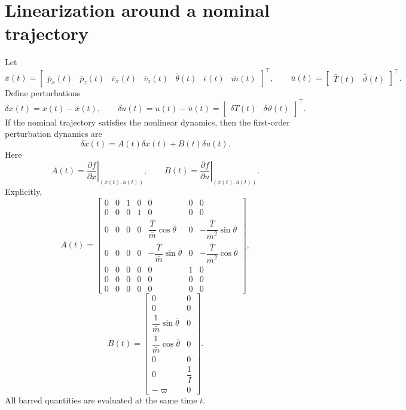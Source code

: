 \documentclass[10pt]{article}
\newcommand{\dd}{\delta}
\newcommand{\thb}{\bar\theta}
\newcommand{\mb}{\bar m}
\newcommand{\Tb}{\bar T}
\newcommand{\ub}{\bar u}
\newcommand{\xb}{\bar x}
\newcommand{\eps}{\epsilon}
\newcommand{\vphi}{\varpi}
\begin{document}
\section{Linearization around a nominal trajectory}
Let
\[
    \xb(t)=
    \begin{bmatrix}
    \bar p_x(t) & \bar p_z(t) & \bar v_x(t) & \bar v_z(t) & \thb(t) & \bar\eps(t) & \mb(t)
    \end{bmatrix}^{\top},
    \qquad
    \ub(t)=
    \begin{bmatrix}\Tb(t) & \bar\vartheta(t)\end{bmatrix}^{\top}.
\]
Define perturbations
\[
    \dd x(t)=x(t)-\xb(t),
    \qquad
    \dd u(t)=u(t)-\ub(t)=
    \begin{bmatrix}\dd T(t) & \dd\vartheta(t)\end{bmatrix}^{\top}.
\]
If the nominal trajectory satisfies the nonlinear dynamics, then the first-order perturbation dynamics are
\[
    \boxed{\dd\dot x(t)=A(t)\dd x(t)+B(t)\dd u(t)}.
\]
Here
\[
    A(t)=\left.\frac{\partial f}{\partial x}\right|_{(\xb(t),\ub(t))},
    \qquad
    B(t)=\left.\frac{\partial f}{\partial u}\right|_{(\xb(t),\ub(t))}.
\]
Explicitly,
{\small
\[
A(t)=
\begin{bmatrix}
0&0&1&0&0&0&0\\
0&0&0&1&0&0&0\\
0&0&0&0&\dfrac{\Tb}{\mb}\cos\thb&0&-\dfrac{\Tb}{\mb^2}\sin\thb\\
0&0&0&0&-\dfrac{\Tb}{\mb}\sin\thb&0&-\dfrac{\Tb}{\mb^2}\cos\thb\\
0&0&0&0&0&1&0\\
0&0&0&0&0&0&0\\
0&0&0&0&0&0&0
\end{bmatrix},
\]
\[
B(t)=
\begin{bmatrix}
0&0\\
0&0\\
\dfrac{1}{\mb}\sin\thb&0\\
\dfrac{1}{\mb}\cos\thb&0\\
0&0\\
0&\dfrac{1}{I}\\
-\vphi&0
\end{bmatrix}.
\]
}
All barred quantities are evaluated at the same time $t$.
\end{document}
